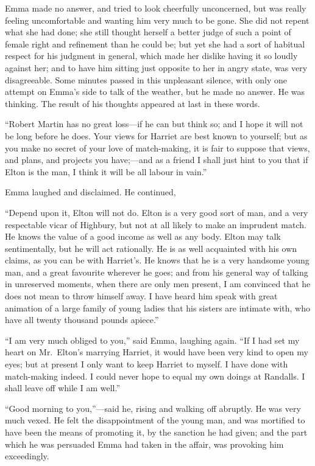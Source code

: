 Emma made no answer, and tried to look cheerfully unconcerned, but was
really feeling uncomfortable and wanting him very much to be gone.
She did not repent what she had done; she still thought herself
a better judge of such a point of female right and refinement than he
could be; but yet she had a sort of habitual respect for his judgment
in general, which made her dislike having it so loudly against her;
and to have him sitting just opposite to her in angry state,
was very disagreeable.  Some minutes passed in this unpleasant silence,
with only one attempt on Emma's side to talk of the weather,
but he made no answer.  He was thinking.  The result of his thoughts
appeared at last in these words.

``Robert Martin has no great loss---if he can but think so; and I
hope it will not be long before he does.  Your views for Harriet
are best known to yourself; but as you make no secret of your love
of match-making, it is fair to suppose that views, and plans,
and projects you have;---and as a friend I shall just hint to you
that if Elton is the man, I think it will be all labour in vain.''

Emma laughed and disclaimed.  He continued,

``Depend upon it, Elton will not do.  Elton is a very good sort of man,
and a very respectable vicar of Highbury, but not at all likely
to make an imprudent match.  He knows the value of a good income
as well as any body.  Elton may talk sentimentally, but he will
act rationally.  He is as well acquainted with his own claims, as you
can be with Harriet's. He knows that he is a very handsome young man,
and a great favourite wherever he goes; and from his general way
of talking in unreserved moments, when there are only men present,
I am convinced that he does not mean to throw himself away.
I have heard him speak with great animation of a large family
of young ladies that his sisters are intimate with, who have all
twenty thousand pounds apiece.''

``I am very much obliged to you,'' said Emma, laughing again.
``If I had set my heart on Mr.\ Elton's marrying Harriet, it would
have been very kind to open my eyes; but at present I only want
to keep Harriet to myself.  I have done with match-making indeed.
I could never hope to equal my own doings at Randalls.  I shall leave
off while I am well.''

``Good morning to you,''---said he, rising and walking off abruptly.
He was very much vexed.  He felt the disappointment of the young man,
and was mortified to have been the means of promoting it, by the
sanction he had given; and the part which he was persuaded Emma had
taken in the affair, was provoking him exceedingly.

